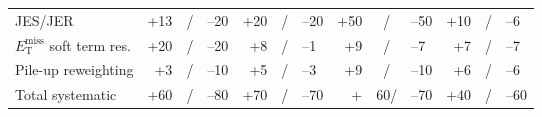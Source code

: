 \begin{table}
\begin{center}
\begin{tabular}{l*{4}{|r@{}c@{}l}}
JES/JER             & +13&/&--20 & +20&/&--20 & +50&/&--50  & +10&/&--6  \\
 
$E_\text{T}^\text{miss}$ soft term res.& +20&/&--20 & +8&/&--1   & +9&/&--7 &
                                                                     +7&/&--7 \\
Pile-up reweighting           & +3&/&--10 & +5&/&--3   & +9&/&--10  & +6&/&--6 \\
\hline
Total systematic & +60&/&--80 & +70&/&--70     & +&60/&--70 & +40&/&--60  \\
\end{tabular}
\end{center}
\end{table}
 
 
\clearpage

